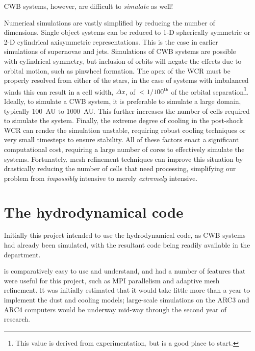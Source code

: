 CWB systems, however, are difficult to \emph{simulate} as well!

Numerical simulations are vastly simplified by reducing the number of dimensions.
Single object systems can be reduced to 1-D spherically symmetric or 2-D cylindrical axisymmetric representations.
This is the case in earlier simulations of supernovae and jets.
Simulations of CWB systems are possible with cylindrical symmetry, but inclusion of orbits will negate the effects due to orbital motion, such as pinwheel formation.
The apex of the WCR must be properly resolved from either of the stars, in the case of systems with imbalanced winds this can result in a cell width, $\Delta x$, of $<1/100^{\text{th}}$ of the orbital separation\footnote{This value is derived from experimentation, but is a good place to start.}.
Ideally, to simulate a CWB system, it is preferable to simulate a large domain, typically \SI{100}{AU} to \SI{1000}{AU}.
This further increases the number of cells required to simulate the system.
Finally, the extreme degree of cooling in the post-shock WCR can render the simulation unstable, requiring robust cooling techniques or very small timesteps to ensure stability.
All of these factors enact a significant computational cost, requiring a large number of cores to effectively simulate the systems.
Fortunately, mesh refinement techniques can improve this situation by drastically reducing the number of cells that need processing, simplifying our problem from \textit{impossibly} intensive to merely \textit{extremely} intensive.

\section{The \mg{} hydrodynamical code}
\label{sec:mgcode}


Initially this project intended to use the \mg{} hydrodynamical code, as CWB systems had already been simulated, with the resultant code being readily available in the department.

\mg{} is comparatively easy to use and understand, and had a number of features that were useful for this project, such as MPI parallelism and adaptive mesh refinement.
It was initially estimated that it would take little more than a year to implement the dust and cooling models; large-scale simulations on the ARC3 and ARC4 computers would be underway mid-way through the second year of research.

